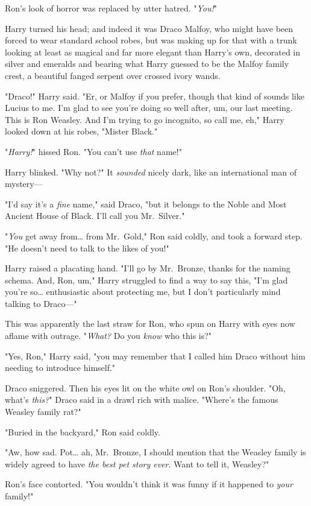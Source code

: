 Ron's look of horror was replaced by utter hatred. "\emph{You!}"

Harry turned his head; and indeed it was Draco Malfoy, who might have been 
forced to wear standard school robes, but was making up for that with a trunk 
looking at least as magical and far more elegant than Harry's own, decorated in 
silver and emeralds and bearing what Harry guessed to be the Malfoy family 
crest, a beautiful fanged serpent over crossed ivory wands.

"Draco!" Harry said. "Er, or Malfoy if you prefer, though that kind of sounds 
like Lucius to me. I'm glad to see you're doing so well after, um, our last 
meeting. This is Ron Weasley. And I'm trying to go incognito, so call me, eh," 
Harry looked down at his robes, "Mister Black."

"\emph{Harry!}" hissed Ron. "You can't use \emph{that} name!"

Harry blinked. "Why not?" It \emph{sounded} nicely dark, like an international 
man of mystery---

"I'd say it's a \emph{fine} name," said Draco, "but it belongs to the Noble and 
Most Ancient House of Black. I'll call you Mr.~Silver."

"\emph{You} get away from{\ldots} from Mr.~Gold," Ron said coldly, and took a 
forward step. "He doesn't need to talk to the likes of you!"

Harry raised a placating hand. "I'll go by Mr.~Bronze, thanks for the naming 
schema. And, Ron, um," Harry struggled to find a way to say this, "I'm glad 
you're so{\ldots} enthusiastic about protecting me, but I don't particularly 
mind talking to Draco---"

This was apparently the last straw for Ron, who spun on Harry with eyes now 
aflame with outrage. "\emph{What?} Do you \emph{know} who this is?"

"Yes, Ron," Harry said, "you may remember that I called him Draco without him 
needing to introduce himself."

Draco sniggered. Then his eyes lit on the white owl on Ron's shoulder. "Oh, 
what's \emph{this?}" Draco said in a drawl rich with malice. "Where's the 
famous Weasley family rat?"

"Buried in the backyard," Ron said coldly.

"Aw, how sad. Pot{\ldots} ah, Mr.~Bronze, I should mention that the Weasley 
family is widely agreed to have \emph{the best pet story ever}. Want to tell 
it, Weasley?"

Ron's face contorted. "You wouldn't think it was funny if it happened to 
\emph{your} family!"

